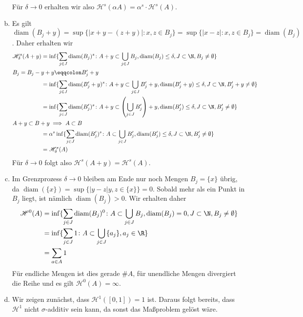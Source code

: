 \documentclass{article}
\newcommand{\diam}{\operatorname{diam}}
\begin{document}
\begin{enumerate}[(a)]
        Für $\delta \to 0$ erhalten wir also $\mathscr H^s(\alpha A) = \alpha^s\cdot \mathscr H^s(A)$.
        \item Es gilt $\diam(B_j + y) = \sup \{|x + y - (z + y)|\colon x,z \in B_j\} = \sup \{|x -z|\colon x,z \in B_j\} = \diam(B_j)$.
        Daher erhalten wir
        \begin{align*}
            \mathscr H_\delta^s(A + y) &= \inf \{\sum_{j \in J} \diam(B_j)^s\colon A + y \subset \bigcup_{j\in J} B_j,\diam(B_j) \leq \delta, J\subset \N, B_j \neq \emptyset\}\\
            \intertext{$B_j = B_j - y + y \eqqcolon B_j' + y$}
            &= \inf \{\sum_{j \in J} \diam(B_j' + y)^s\colon A + y \subset \bigcup_{j\in J} B_j' + y,\diam( B_j' + y) \leq \delta, J\subset \N,  B_j' + y \neq \emptyset\}\\
            &= \inf \{\sum_{j \in J} \diam( B_j')^s\colon A + y \subset \left(\bigcup_{j\in J} B_j'\right) + y, \diam(B_j') \leq \delta, J\subset \N, B_j' \neq \emptyset\}\\
            \intertext{$ A + y \subset B + y \implies A \subset B$}
            &=  \alpha^s \inf \{\sum_{j \in J} \diam( B_j')^s\colon A \subset \bigcup_{j\in J} B_j', \diam(B_j') \leq \delta, J\subset \N, B_j' \neq \emptyset\}\\
            &= \mathscr H_{\delta}^s(A)
        \end{align*}
        Für $\delta \to 0$ folgt also $\mathscr H^s(A + y) = \mathscr H^s(A)$.
        \item Im Grenzprozess $\delta \to 0$ bleiben am Ende nur noch Mengen $B_j = \{x\}$ übrig, da $\diam(\{x\}) = \sup \{|y-z| y,z\in \{x\}\} = 0$. Sobald mehr als ein Punkt in $B_j$ liegt, ist nämlich $\diam(B_j) > 0$. Wir erhalten daher
        \begin{align*}
            \mathscr H^0(A) &= \inf \{\sum_{j \in J} \diam(B_j)^0 \colon A \subset \bigcup_{j\in J} B_j,\diam(B_j) = 0, J\subset \N, B_j \neq \emptyset\}\\
            &= \inf \{\sum_{j \in J} 1 \colon A \subset \bigcup_{j \in J} \{a_j\}, a_j \in \R\}\\
            &= \sum_{a\in A} 1
        \end{align*}
        Für endliche Mengen ist dies gerade $\#A$, für unendliche Mengen divergiert die Reihe und es gilt $\mathscr H^0(A) = \infty$.
        \item Wir zeigen zunächst, dass $\mathscr H^1([0,1]) = 1$ ist. Daraus folgt bereits, dass $\mathscr H^1$ nicht $\sigma$-additiv sein kann, da sonst das Maßproblem gelöst wäre.

\end{enumerate}
\end{document}
